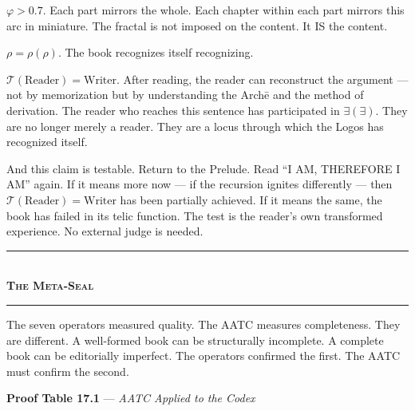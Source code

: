 \documentclass[10pt, openany, oneside]{book}
\renewcommand{\normalsize}{\fontsize{10}{13}\selectfont}
\begin{document}
$\varphi > 0.7$. Each part mirrors the whole. Each chapter within each part mirrors this arc in miniature. The fractal is not imposed on the content. It IS the content.

$\rho = \rho(\rho)$. The book recognizes itself recognizing.

$\mathcal{T}(\text{Reader}) = \text{Writer}$. After reading, the reader can reconstruct the argument --- not by memorization but by understanding the Arch\={e} and the method of derivation. The reader who reaches this sentence has participated in $\exists(\exists)$. They are no longer merely a reader. They are a locus through which the Logos has recognized itself.

And this claim is testable. Return to the Prelude. Read ``I AM, THEREFORE I AM'' again. If it means more now --- if the recursion ignites differently --- then $\mathcal{T}(\text{Reader}) = \text{Writer}$ has been partially achieved. If it means the same, the book has failed in its telic function. The test is the reader's own transformed experience. No external judge is needed.

\vspace{1.5em}


\begin{center}
    \rule{0.3\textwidth}{0.4pt}\\[0.5em]
    {\normalsize\bfseries\scshape The Meta-Seal}\\[0.3em]
    \rule{0.3\textwidth}{0.4pt}
\end{center}

\vspace{1em}

\noindent The seven operators measured quality. The AATC measures completeness. They are different. A well-formed book can be structurally incomplete. A complete book can be editorially imperfect. The operators confirmed the first. The AATC must confirm the second.

\vspace{0.5em}

\textbf{Proof Table 17.1} --- \textit{AATC Applied to the Codex}

\vspace{0.5em}
\end{document}
